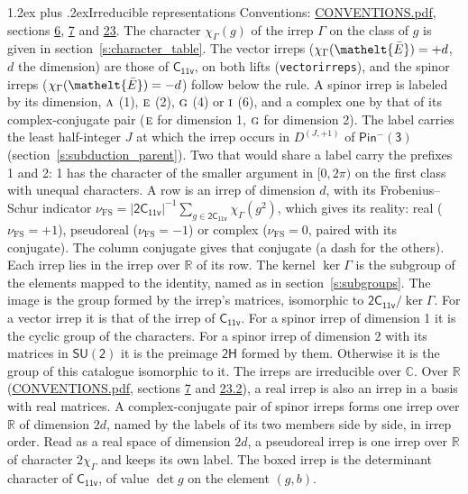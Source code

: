 \documentclass[10pt,a4paper]{article}
\makeatletter
\renewcommand\section{\@startsection{section}{1}{\z@}{-3ex plus -1ex minus -.2ex}%
  {1.2ex plus .2ex}{\normalfont\large\sffamily\bfseries\color{parttitle}}}
\numberwithin{equation}{section}
\newcommand{\eltfont}[1]{{\let\sigma\eltsigma\mathelt{#1}}}
\newcommand{\grp}[1]{\mathsf{#1}}
\newcommand{\irr}[1]{\text{\normalfont\scshape #1}}
\newcommand{\elt}[1]{\eltfont{#1}}
\newcommand{\irrJp}[2]{D^{(#1,#2)}}
\newcommand{\irchar}[1]{\chi_{#1}}
\newcommand{\fsind}{\nu_{\mathrm{FS}}}
\newcommand{\barred}[1]{\bar{#1}}
\makeatother
\begin{document}
\section{Irreducible representations}\label{s:irreps}
Conventions: \href{../../CONVENTIONS.pdf}{CONVENTIONS.pdf}, sections \href{../../../rotation/CONVENTIONS.pdf\#conv.6}{6}, \href{../../../rotation/CONVENTIONS.pdf\#conv.7}{7} and \href{../../CONVENTIONS.pdf\#conv.23}{23}.
\leavevmode\label{n:function.character}\label{n:irrep.Gamma}The character $\irchar{\Gamma}(g)$ of the irrep $\Gamma$ on the class of $g$ is given in section~\ref{s:character_table}. \label{n:index.dimension}The vector irreps ($\irchar{\Gamma}(\elt{\barred{E}}) = +d$, $d$ the dimension) are those of \href{../../../rotation/data/pdf/C11v.pdf}{$\grp{C_{11v}}$}, on both lifts (\texttt{vectorirreps}), and the spinor irreps ($\irchar{\Gamma}(\elt{\barred{E}}) = -d$) follow below the rule. A spinor irrep is labeled by its dimension, $\irr{a}$ (1), $\irr{e}$ (2), $\irr{g}$ (4) or $\irr{i}$ (6), and a complex one by that of its complex-conjugate pair ($\irr{e}$ for dimension 1, $\irr{g}$ for dimension 2). The label carries the least half-integer $J$ at which the irrep occurs in $\irrJp{J}{+1}$ of $\grp{Pin^{-}(3)}$ (section~\ref{s:subduction_parent}). Two that would share a label carry the prefixes 1 and 2: 1 has the character of the smaller argument in $[0, 2\pi)$ on the first class with unequal characters.
\leavevmode\label{n:index.frobenius}\label{n:head.irrep}\label{n:head.reality}A row is an irrep of dimension $d$, with its Frobenius--Schur indicator $\fsind = |\grp{2C_{11v}}|^{-1}\allowbreak\sum_{g\in\grp{2C_{11v}}}\irchar{\Gamma}(g^2)$, which gives its reality: real ($\fsind = +1$), pseudoreal ($\fsind = -1$) or complex ($\fsind = 0$, paired with its conjugate). \label{n:head.conjugate}The column conjugate gives that conjugate (a dash for the others). \label{n:head.over.real}Each irrep lies in the irrep over $\mathbb{R}$ of its row. \label{n:head.kernel}The kernel $\ker\Gamma$ is the subgroup of the elements mapped to the identity, named as in section~\ref{s:subgroups}. \label{n:head.image}The image is the group formed by the irrep's matrices, isomorphic to $\grp{2C_{11v}}/\ker\Gamma$. For a vector irrep it is that of the irrep of \href{../../../rotation/data/pdf/C11v.pdf}{$\grp{C_{11v}}$}. For a spinor irrep of dimension 1 it is the cyclic group of the characters. For a spinor irrep of dimension 2 with its matrices in $\grp{SU(2)}$ it is the preimage $\grp{2H}$ formed by them. Otherwise it is the group of this catalogue isomorphic to it. The irreps are irreducible over $\mathbb{C}$. Over $\mathbb{R}$ (\href{../../CONVENTIONS.pdf}{CONVENTIONS.pdf}, sections \href{../../../rotation/CONVENTIONS.pdf\#conv.7}{7} and \href{../../CONVENTIONS.pdf\#conv.23.2}{23.2}), a real irrep is also an irrep in a basis with real matrices. A complex-conjugate pair of spinor irreps forms one irrep over $\mathbb{R}$ of dimension $2d$, named by the labels of its two members side by side, in irrep order. Read as a real space of dimension $2d$, a pseudoreal irrep is one irrep over $\mathbb{R}$ of character $2\irchar{\Gamma}$ and keeps its own label. \label{n:mark.determinant}The boxed irrep is the determinant character of \href{../../../rotation/data/pdf/C11v.pdf}{$\grp{C_{11v}}$}, of value $\det g$ on the element $(g, b)$.
\end{document}

